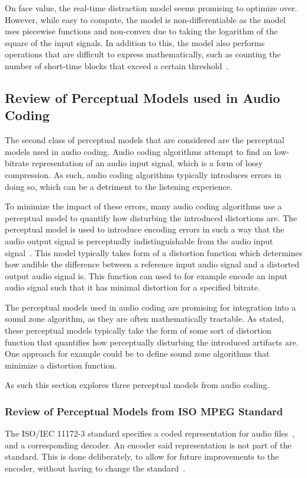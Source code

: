 On face value, the real-time distraction model seems promising to optimize over.
However, while easy to compute, the model is non-differentiable as the model uses
piecewise functions and non-convex due to taking the logarithm of the square of the input signals.
In addition to this, the model also performs operations that are difficult to express mathematically, such as counting 
the number of short-time blocks that exceed a certain threshold~\cite{ramo2017real}.

\subsection{Review of Perceptual Models used in Audio Coding}
\label{ch:perceptual:review:audio_coding}
The second class of perceptual models that are considered are the perceptual models used in audio coding.
Audio coding algorithms attempt to find an low-bitrate representation of an audio input signal, which is a 
form of lossy compression.
As such, audio coding algorithms typically introduces errors in doing so, which can be a detriment to the listening experience.

To minimize the impact of these errors, 
many audio coding algorithms use a perceptual model to quantify how disturbing the introduced distortions are.
The perceptual model is used to introduce encoding errors in such a way that the audio output
signal is perceptually indistinguishable from the audio input signal~\cite{taal2012low}.
This model typically takes form of a distortion function which determines how
audible the difference between a reference input audio signal and a distorted output audio signal is.
This function can used to for example encode an input audio signal such that it has minimal distortion for a
specified bitrate.

The perceptual models used in audio coding are promising for integration into a sound zone algorithm, as they are 
often mathematically tractable.
As stated, these perceptual models typically take the form of some sort of distortion function that quantifies
how perceptually disturbing the introduced artifacts are. 
One approach for example could be to define sound zone algorithms that minimize a distortion function.

As such this section explores three perceptual models from audio coding.

\subsubsection{Review of Perceptual Models from ISO MPEG Standard}
The ISO/IEC 11172-3 standard specifies a coded representation for audio files~\cite{ISO11172-3}, 
and a corresponding decoder.
An encoder said representation is not part of the standard.
This is done deliberately, to allow for future improvements to the encoder, without having to change the standard~\cite{pan1995tutorial}.

